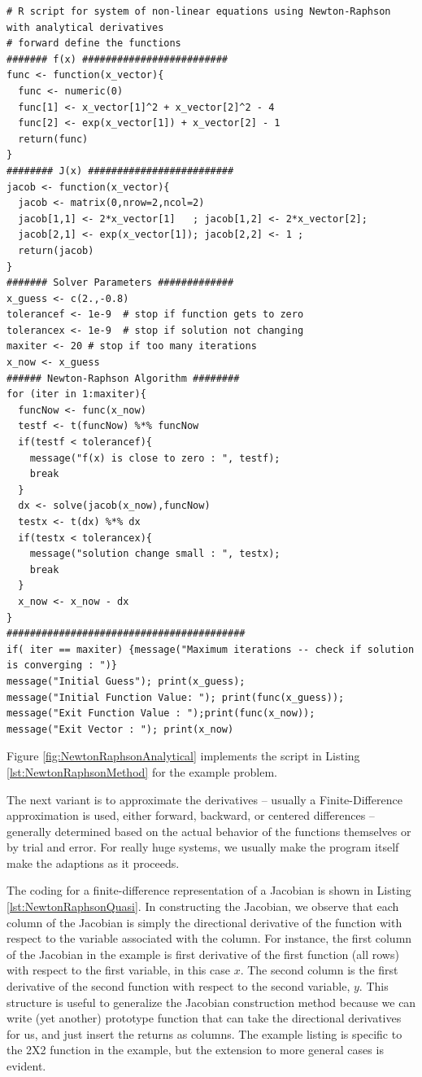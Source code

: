 \begin{lstlisting}[caption=R code demonstrating Newton's Method calculations, label=lst:NewtonRaphsonMethod]
# R script for system of non-linear equations using Newton-Raphson with analytical derivatives
# forward define the functions
####### f(x) #########################
func <- function(x_vector){
  func <- numeric(0)
  func[1] <- x_vector[1]^2 + x_vector[2]^2 - 4
  func[2] <- exp(x_vector[1]) + x_vector[2] - 1
  return(func)
}
######## J(x) #########################
jacob <- function(x_vector){
  jacob <- matrix(0,nrow=2,ncol=2)
  jacob[1,1] <- 2*x_vector[1]   ; jacob[1,2] <- 2*x_vector[2];
  jacob[2,1] <- exp(x_vector[1]); jacob[2,2] <- 1 ;
  return(jacob)
}
####### Solver Parameters #############
x_guess <- c(2.,-0.8)
tolerancef <- 1e-9  # stop if function gets to zero
tolerancex <- 1e-9  # stop if solution not changing
maxiter <- 20 # stop if too many iterations
x_now <- x_guess
###### Newton-Raphson Algorithm ########
for (iter in 1:maxiter){
  funcNow <- func(x_now)
  testf <- t(funcNow) %*% funcNow
  if(testf < tolerancef){
    message("f(x) is close to zero : ", testf);
    break
  }
  dx <- solve(jacob(x_now),funcNow)
  testx <- t(dx) %*% dx
  if(testx < tolerancex){
    message("solution change small : ", testx);
    break
  }
  x_now <- x_now - dx
}
#########################################
if( iter == maxiter) {message("Maximum iterations -- check if solution is converging : ")}
message("Initial Guess"); print(x_guess);
message("Initial Function Value: "); print(func(x_guess));
message("Exit Function Value : ");print(func(x_now));
message("Exit Vector : "); print(x_now)
\end{lstlisting}

Figure \ref{fig:NewtonRaphsonAnalytical} implements the script in Listing \ref{lst:NewtonRaphsonMethod} for the example problem.  

The next variant is to approximate the derivatives -- usually a Finite-Difference approximation is used, either forward, backward, or centered differences -- generally determined based on the actual behavior of the functions themselves or by trial and error. 
For really huge systems, we usually make the program itself make the adaptions as it proceeds.

The coding for a finite-difference representation of a Jacobian is shown in Listing \ref{lst:NewtonRaphsonQuasi}.  
In constructing the Jacobian, we observe that each column of the Jacobian is simply the directional derivative of the function with respect to the variable associated with the column.  
For instance, the first column of the Jacobian in the example is first derivative of the first function (all rows) with respect to the first variable, in this case $x$.  The second column is the first derivative of the second function with respect to the second variable, $y$.  
This structure is useful to generalize the Jacobian construction method because we can write (yet another) prototype function that can take the directional derivatives for us, and just insert the returns as columns.
The example listing is specific to the 2X2 function in the example, but the extension to more general cases is evident.

